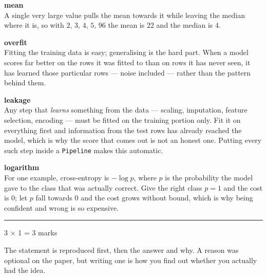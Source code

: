 \documentclass[10pt,a4paper]{article}
\newcommand{\parthead}[2]{\vspace{2pt}\noindent\rule{\linewidth}{0.4pt}\par\vspace{2pt}%
  \noindent{\bfseries Part #1}\hfill{\small #2}\par\vspace{1pt}}
\newcommand{\sol}[1]{\textbf{#1}}
\begin{document}
\begin{sB}

  \item \sol{mean}\\ A single very large value pulls the mean towards it while leaving the median where it is, so with $2,\,3,\,4,\,5,\,96$ the mean is $22$ and the median is $4$.

  \item \sol{overfit}\\ Fitting the training data is easy; generalising is the hard part. When a model scores far better on the rows it was fitted to than on rows it has never seen, it has learned those particular rows --- noise included --- rather than the pattern behind them.

  \item \sol{leakage}\\ Any step that \emph{learns} something from the data --- scaling, imputation, feature selection, encoding --- must be fitted on the training portion only. Fit it on everything first and information from the test rows has already reached the model, which is why the score that comes out is not an honest one. Putting every such step inside a \texttt{Pipeline} makes this automatic.

  \item \sol{logarithm}\\ For one example, cross-entropy is $-\log p$, where $p$ is the probability the model gave to the class that was actually correct. Give the right class $p = 1$ and the cost is $0$; let $p$ fall towards $0$ and the cost grows without bound, which is why being confident and wrong is so expensive.

\end{sB}

\newpage

\parthead{C --- True or false}{3 $\times$ 1 = 3 marks}

{\small The statement is reproduced first, then the answer and why. A reason was optional on the paper, but writing one is how you find out whether you actually had the idea.}
\end{document}
